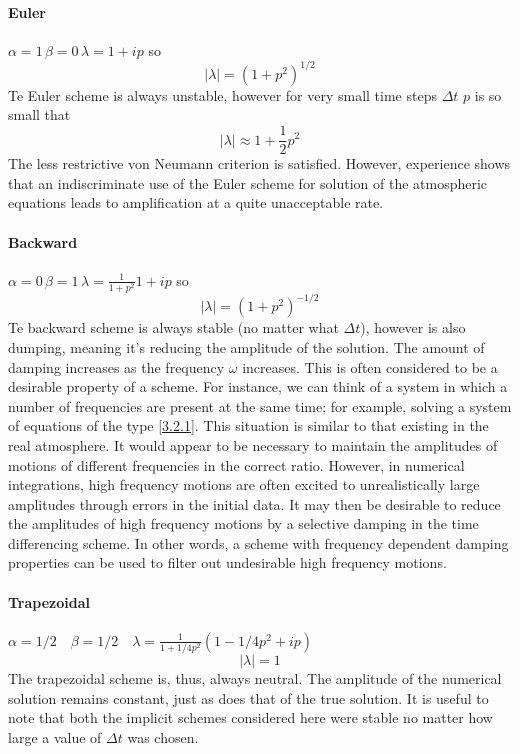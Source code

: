 \paragraph{Euler} $\alpha=1 \, \beta=0 \, \lambda=1+ip$
so $$|\lambda|=(1+p^2)^{1/2}$$
Te Euler scheme is always unstable, however for very small time steps $\Delta t$ $p$ is so small that
$$|\lambda|\approx 1+\frac{1}{2}p^2$$
The less restrictive von Neumann criterion is satisfied. However, experience shows that an indiscriminate use of the Euler scheme for solution of the atmospheric equations leads to amplification at a quite unacceptable rate.
\paragraph{Backward} $\alpha=0 \, \beta=1 \, \lambda=\frac{1}{1+p^2}1+ip$
so $$|\lambda|=(1+p^2)^{-1/2}$$
Te backward scheme is always stable (no matter what $\Delta t$), however is also dumping, meaning it's reducing the amplitude of the solution. The amount of damping increases as the frequency $\omega$ increases. This is often considered to be a desirable property of a scheme. For instance, we can think of a system in which a number of frequencies are present at the same time; for example, solving a system of equations of the type \ref{3.2.1}. This situation is similar to that existing in the real atmosphere. It would appear to be necessary to maintain the amplitudes of motions of different frequencies in the correct ratio. However, in numerical integrations, high frequency motions are often excited to unrealistically large amplitudes through errors in the initial data. It may then be desirable to reduce the amplitudes of high frequency motions by a selective damping in the time differencing scheme. In other words, a scheme with frequency dependent damping properties can be used to filter out undesirable high frequency motions.
\paragraph{Trapezoidal} $\alpha=1/2 \quad \beta=1/2 \quad \lambda=\frac{1}{1+1/4p^2}\left(1-1/4p^2+ip\right)$
 $$|\lambda|=1$$
 The trapezoidal scheme is, thus, always neutral. The amplitude of the numerical solution remains constant, just as does that of the true solution. It is useful to note that both the implicit schemes considered here were stable no matter how large a value of $\Delta t$ was chosen.
